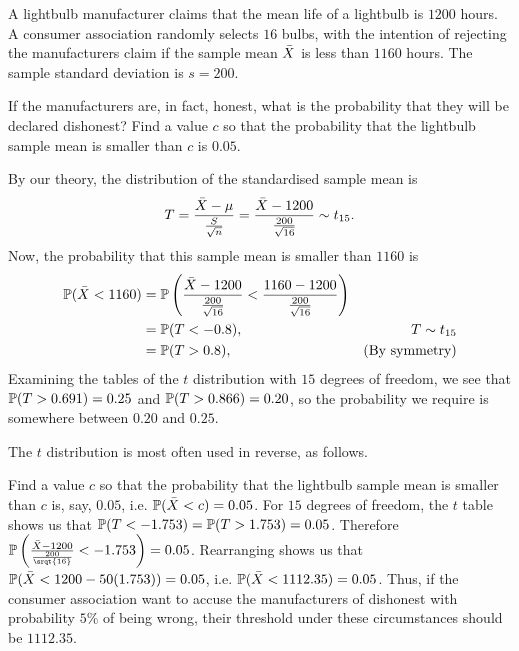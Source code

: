 \documentclass[10pt, a4paper]{article}
\begin{document}
\begin{example}
    A lightbulb manufacturer claims that the mean life of a lightbulb is $1200$ hours.
    A consumer association randomly selects $16$ bulbs,
    with the intention of rejecting the manufacturers claim if the sample mean $\Bar{X}$ is less than $1160$ hours.
    The sample standard deviation is $s = 200$.

    If the manufacturers are,
    in fact,
    honest,
    what is the probability that they will be declared dishonest?
    Find a value $c$ so that the probability that the lightbulb sample mean is smaller than $c$ is $0.05$.

    \begin{solution}
        By our theory,
        the distribution of the standardised sample mean is
        \[
        T = \frac{\Bar{X} - \mu}{\frac{S}{\sqrt{n}}} = \frac{\Bar{X} - 1200}{\frac{200}{\sqrt{16}}} \sim t_{15}.
        \]
        Now,
        the probability that this sample mean is smaller than $1160$ is
        \begin{align*}
            \P(\Bar{X} < 1160) &= \P\left(\frac{\Bar{X} - 1200}{\frac{200}{\sqrt{16}}} < \frac{1160 - 1200}{\frac{200}{\sqrt{16}}}\right) \\
            &= \P(T < -0.8), & T \sim t_{15} \\
            &= \P(T > 0.8), &(\text{By symmetry})
        \end{align*}
        Examining the tables of the $t$ distribution with $15$ degrees of freedom,
        we see that $\P(T > 0.691) = 0.25$ and $\P(T > 0.866) = 0.20$,
        so the probability we require is somewhere between $0.20$ and $0.25$.

        The $t$ distribution is most often used in reverse,
        as follows.

        Find a value $c$ so that the probability that the lightbulb sample mean is smaller than $c$ is,
        say,
        $0.05$,
        i.e. $\P(\Bar{X} < c) = 0.05$.
        For $15$ degrees of freedom,
        the $t$ table shows us that $\P(T < -1.753) = \P(T > 1.753) = 0.05$.
        Therefore $\P\left(\frac{\Bar{X} - 1200}{\frac{200}{\srqt{16}}} < -1.753\right) = 0.05$.
        Rearranging shows us that $\P(\Bar{X} < 1200 - 50(1.753)) = 0.05$,
        i.e. $\P(\Bar{X} < 1112.35) = 0.05$.
        Thus,
        if the consumer association want to accuse the manufacturers of dishonest with probability $5\%$ of being wrong,
        their threshold under these circumstances should be $1112.35$.
    \end{solution}
\end{example}
\end{document}
